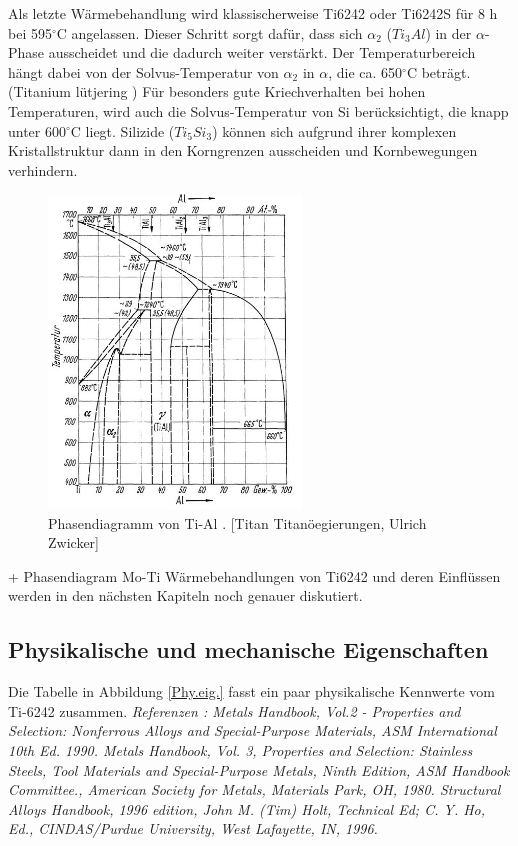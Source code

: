 Als letzte Wärmebehandlung wird klassischerweise  Ti6242 oder Ti6242S für  8 h bei 595$^\circ$C angelassen. Dieser Schritt sorgt dafür, dass sich $\alpha_2$ ($Ti_3Al$) in der $\alpha$-Phase ausscheidet und die dadurch weiter verstärkt. Der Temperaturbereich hängt dabei von der Solvus-Temperatur von $\alpha_2$ in $\alpha$, die ca. 650$^\circ$C beträgt.(Titanium lütjering )
Für besonders gute Kriechverhalten bei hohen Temperaturen, wird auch die Solvus-Temperatur von Si berücksichtigt, die knapp unter 600$^\circ$C liegt. Silizide ($Ti_5Si_3$) können sich aufgrund ihrer komplexen Kristallstruktur dann in den Korngrenzen ausscheiden und Kornbewegungen verhindern.


\begin{figure}[H]
	\centering
	\includegraphics[width=0.6\textwidth]{Bilder/TiAl}
	\caption{Phasendiagramm von Ti-Al . [Titan Titanöegierungen, Ulrich Zwicker]}
\end{figure}
+ Phasendiagram Mo-Ti
Wärmebehandlungen von Ti6242 und deren Einflüssen werden in den nächsten Kapiteln noch genauer diskutiert.


\subsection{Physikalische und mechanische Eigenschaften }

Die Tabelle in Abbildung \ref{Phy.eig.} fasst ein paar physikalische Kennwerte vom Ti-6242 zusammen.
\newline
\textit{	Referenzen : 
	Metals Handbook, Vol.2 - Properties and Selection: Nonferrous Alloys and Special-Purpose Materials, ASM International 10th Ed. 1990.				
	Metals Handbook, Vol. 3, Properties and Selection: Stainless Steels, Tool Materials and Special-Purpose Metals, Ninth Edition, ASM Handbook Committee., American Society for Metals, Materials Park, OH, 1980.				
	Structural Alloys Handbook, 1996 edition, John M. (Tim) Holt, Technical Ed; C. Y. Ho, Ed., CINDAS/Purdue University, West Lafayette, IN, 1996. }

